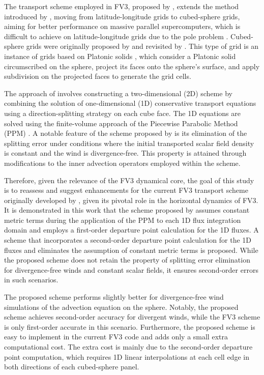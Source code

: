 \documentclass[preprint,12pt]{elsarticle}
\begin{document}
\begin{linenumbers}
The transport scheme employed in FV3, proposed by \cite{putman:2007}, extends the method introduced by \cite{lin:1996}, moving from latitude-longitude grids to cubed-sphere grids, aiming for better performance on massive parallel supercomputers, which is difficult to achieve on latitude-longitude grids due to the pole problem \cite{will:2007,stan:2012}.
Cubed-sphere grids were originally proposed by \cite{sadourny:1972} and revisited by \cite{rancic:1996,ronchi:1996}. 
This type of grid is an instance of grids based on Platonic solids \cite{stan:2012}, which consider a Platonic solid circumscribed on the sphere, project its faces onto the sphere's surface, and apply subdivision on the projected faces to generate the grid cells.

The approach of \cite{lin:1996,putman:2007} involves constructing a two-dimensional (2D) scheme by combining the solution of one-dimensional (1D) conservative transport equations using a direction-splitting strategy on each cube face.
The 1D equations are solved using the finite-volume approach of the Piecewise Parabolic Method (PPM) \cite{colella:1984,carpenter:1990}. 
A notable feature of the scheme proposed by \cite{lin:1996} is its elimination of the splitting error under conditions where the initial transported scalar field density is constant and the wind is divergence-free. 
This property is attained through modifications to the inner advection operators employed within the scheme. 

Therefore, given the relevance of the FV3 dynamical core,
the goal of this study is to reassess and suggest enhancements for the current FV3 transport scheme originally developed by \cite{putman:2007}, given its pivotal role in the horizontal dynamics of FV3.
It is demonstrated in this work that the scheme proposed by \cite{putman:2007} assumes constant metric terms during the application of the PPM to each 1D flux integration domain and employs a first-order departure point calculation for the 1D fluxes.
A scheme that incorporates a second-order departure point calculation for the 1D fluxes and eliminates the assumption of constant metric terms is proposed.
While the proposed scheme does not retain the property of splitting error elimination for divergence-free winds and constant scalar fields, it ensures second-order errors in such scenarios.

The proposed scheme performs slightly better for divergence-free wind simulations of the advection equation on the sphere.
Notably, the proposed scheme achieves second-order accuracy for divergent winds, while the FV3 scheme is only first-order accurate in this scenario.
Furthermore,  the proposed scheme is easy to implement in the current FV3 code and adds only a small extra computational cost.
The extra cost is mainly due to the second-order departure point computation, which requires 1D linear interpolations at each cell edge in both directions of each cubed-sphere panel.



\end{linenumbers}
\end{document}

